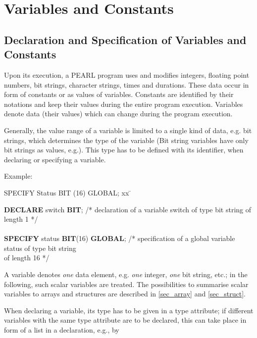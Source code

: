 \chapter{Variables and Constants}  %

\section{Declaration and Specification of Variables and Constants}  %

Upon its execution, a PEARL program uses and modifies integers, floating
point numbers, bit strings, character strings, times and durations.
These data occur in form of constants or as values of variables.
Constants are identified by their notations and keep their values during
the entire program execution. Variables denote data (their values) which
can change during the program execution.

Generally, the value range of a variable is limited to a single kind of data,
e.g. bit strings, which determines the type of the variable (Bit string
variables have only bit strings as values, e.g.). This type has to be
defined with its identifier, when declaring or specifying a
variable.

Example:

\begin{tabbing}
SPECIFY Status BIT (16) GLOBAL; xx \= \kill

{\bf DECLARE} switch {\bf BIT}; \> /* declaration of a variable
                                   switch of type bit string of  \\
                                \> length 1 */ \\
                                \> \\
{\bf SPECIFY} status {\bf BIT}(16) {\bf GLOBAL};
                                \> /* specification of a global
                                   variable status of type bit string \\
                                \> of length 16 */
\end{tabbing}

A variable denotes {\it one} data element, e.g. {\it one} integer, {\it
one} bit string, etc.; in the following, such scalar variables are
treated. The possibilities to summarise scalar variables to arrays and
structures are described in \ref{sec_array} and \ref{sec_struct}.

When declaring a variable, its type has to be given in a type attribute;
if different variables with the same type attribute are to be declared,
this can take place in form of a list in a declaration, e.g., by

